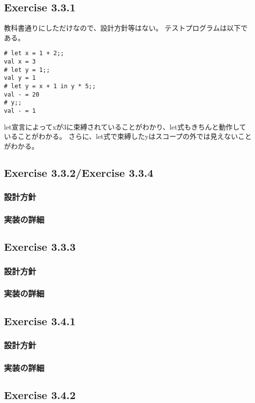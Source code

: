\documentclass{jarticle}
\begin{document}
\subsection{Exercise 3.3.1}
教科書通りにしただけなので、設計方針等はない。
テストプログラムは以下である。
\begin{lstlisting}[basicstyle=\ttfamily\footnotesize, frame=single]
# let x = 1 + 2;;
val x = 3
# let y = 1;;
val y = 1
# let y = x + 1 in y * 5;;
val - = 20
# y;;
val - = 1
\end{lstlisting}
let宣言によってxが3に束縛されていることがわかり、let式もきちんと動作していることがわかる。
さらに、let式で束縛したyはスコープの外では見えないことがわかる。

\subsection{Exercise 3.3.2/Exercise 3.3.4}
\subsubsection{設計方針}
\subsubsection{実装の詳細}

\subsection{Exercise 3.3.3}
\subsubsection{設計方針}
\subsubsection{実装の詳細}

\subsection{Exercise 3.4.1}
\subsubsection{設計方針}
\subsubsection{実装の詳細}

\subsection{Exercise 3.4.2}
\end{document}
